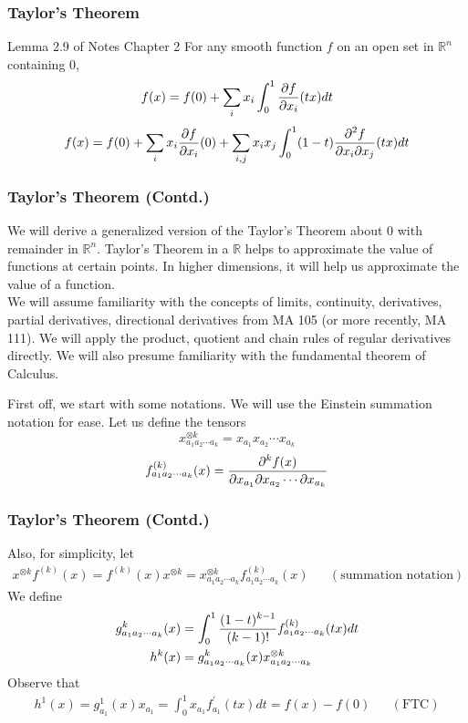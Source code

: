 \begin{frame}
\frametitle{Taylor's Theorem}
\begin{block}{Lemma 2.9 of Notes Chapter 2}
For any smooth function $f$ on an open set in $\mathbb{R}^n$ containing $0$,
\[
f(x)=f(0)+\sum_i x_i\int_0^1 \frac{\displaystyle \partial f}{\displaystyle \partial x_i}(tx)dt
\]
\[
f(x)=f(0)+\sum_i x_i \frac{\displaystyle \partial f}{\displaystyle \partial x_i}(0)+\sum_{i,j} x_ix_j\int_0^1 (1-t) \frac{\displaystyle \partial^2 f}{\displaystyle \partial x_i\partial x_j}(tx)dt
\]
\end{block}
\end{frame}


\begin{frame}
\frametitle{Taylor's Theorem (Contd.)}
We will derive a generalized version of the Taylor's Theorem about 0 with remainder in $\mathbb{R}^n$. Taylor's Theorem in a $\mathbb{R}$ helps to approximate the value of functions at certain points. In higher dimensions, it will help us approximate the value of a function.\\
We will assume familiarity with the concepts of limits, continuity, derivatives, partial derivatives, directional derivatives from MA 105 (or more recently, MA 111). We will apply the product, quotient and chain rules of regular derivatives directly. We will also presume familiarity with the fundamental theorem of Calculus.

First off, we start with some notations. 
We will use the Einstein summation notation for ease. Let us define the tensors
\[
x^{\otimes k}_{a_1a_2\cdots a_k}=x_{a_1}x_{a_2}\cdots x_{a_k}
\]
\[
f^{(k)}_{a_1a_2\cdots a_k}(x)=\frac{\displaystyle \partial^k f(x)}{\displaystyle \partial x_{a_1}\partial x_{a_2}\cdots\partial x_{a_k}}
\]
\end{frame}


\begin{frame}
\frametitle{Taylor's Theorem (Contd.)}
Also, for simplicity, let
\begin{align*}
x^{\otimes k}f^{(k)}(x)=f^{(k)}(x)x^{\otimes k}=x^{\otimes k}_{a_1a_2\cdots a_k}f^{(k)}_{a_1a_2\cdots a_k}(x)&&(\text{summation notation})
\end{align*}
We define
\begin{align*}
g^{k}_{a_1a_2\cdots a_k}(x)&=\int_0^1\frac{\displaystyle (1-t)^{k-1}}{\displaystyle (k-1)!}f^{(k)}_{a_1a_2\cdots a_k}(tx)dt\\
h^k(x)&=g^{k}_{a_1 a_2 \cdots a_k}(x)x^{\otimes k}_{a_1 a_2 \cdots a_k}
\end{align*}
Observe that
\begin{align*}
\label{eq:1}\tag{1}h^1(x)=g^1_{a_1}(x)x_{a_1}=\int_0^1 x_{a_1}f^{\prime}_{a_1}(tx)dt=f(x)-f(0)&&(\text{FTC})
\end{align*}
\end{frame}


